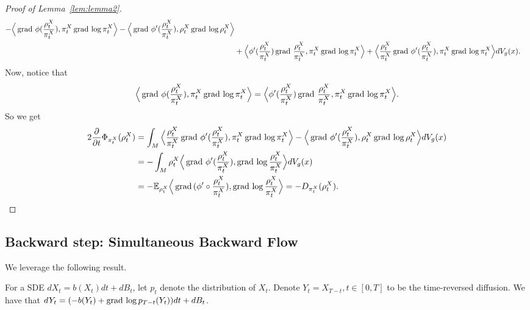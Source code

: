 \begin{proof}[Proof of Lemma~\ref{lem:lemma2}]
\begin{align*}
            - \Big\langle \operatorname{grad\,} \phi(\frac{\rho_{t}^{X}}{\pi_{t}^{X}}), \pi_{t}^{X} \operatorname{grad\,} \log \pi_{t}^{X} \Big\rangle
            - \Big\langle \operatorname{grad\,} \phi'(\frac{\rho_{t}^{X}}{\pi_{t}^{X}}) , \rho_{t}^{X} \operatorname{grad\,} \log \rho_{t}^{X} \Big\rangle \\ & 
            + \Big\langle  \phi'(\frac{\rho_{t}^{X}}{\pi_{t}^{X}}) \operatorname{grad\,} \frac{\rho_{t}^{X}}{\pi_{t}^{X}}, \pi_{t}^{X} \operatorname{grad\,} \log \pi_{t}^{X} \Big\rangle 
            + \Big\langle \frac{\rho_{t}^{X}}{\pi_{t}^{X}}\operatorname{grad\,} \phi'(\frac{\rho_{t}^{X}}{\pi_{t}^{X}}) , \pi_{t}^{X} \operatorname{grad\,} \log \pi_{t}^{X} \Big\rangle dV_{g}(x).
    \end{align*}
  Now, notice that 
    \begin{align*}
        \Big\langle \operatorname{grad\,} \phi(\frac{\rho_{t}^{X}}{\pi_{t}^{X}}), \pi_{t}^{X} \operatorname{grad\,} \log \pi_{t}^{X} \Big\rangle
        = \Big\langle \phi'(\frac{\rho_{t}^{X}}{\pi_{t}^{X}}) \operatorname{grad\,} \frac{\rho_{t}^{X}}{\pi_{t}^{X}}, \pi_{t}^{X} \operatorname{grad\,} \log \pi_{t}^{X} \Big\rangle.
    \end{align*}
    So we get 
    \begin{align*}
            2 \frac{\partial }{\partial t} \Phi_{\pi_{t}^{X}} (\rho_{t}^{X})
            &= \int_{M} \Big\langle \frac{\rho_{t}^{X}}{\pi_{t}^{X}}\operatorname{grad\,} \phi'(\frac{\rho_{t}^{X}}{\pi_{t}^{X}}) , \pi_{t}^{X} \operatorname{grad\,} \log \pi_{t}^{X} \Big\rangle 
            - \Big\langle \operatorname{grad\,} \phi'(\frac{\rho_{t}^{X}}{\pi_{t}^{X}}) , \rho_{t}^{X} \operatorname{grad\,} \log \rho_{t}^{X} \Big\rangle dV_{g}(x)\\
            &= - \int_{M} \rho_{t}^{X} \Big\langle \operatorname{grad\,} \phi'(\frac{\rho_{t}^{X}}{\pi_{t}^{X}}) , \operatorname{grad\,} \log \frac{\rho_{t}^{X}}{\pi_{t}^{X}} \Big\rangle dV_{g}(x) \\
            &= - \mathbb{E}_{\rho_{t}^{X}} \Big\langle \operatorname{grad\,} (\phi' \circ \frac{\rho_{t}^{X}}{\pi_{t}^{X}}) , \operatorname{grad\,} \log \frac{\rho_{t}^{X}}{\pi_{t}^{X}} \Big\rangle 
            = - D_{\pi_{t}^{X}} (\rho_{t}^{X}).
    \end{align*}
\end{proof}

\subsection{Backward step: Simultaneous Backward Flow}\label{Section_Backward}
We leverage the following result.
\begin{theorem}
For a SDE $dX_{t} = b(X_{t}) dt + dB_{t}$, let $p_{t}$ denote the distribution of $X_{t}$. Denote $Y_{t} = X_{T - t}, t \in [0, T]$ to be the time-reversed diffusion. We have that $dY_{t} = (-b(Y_{t}) + \operatorname{grad\,} \log p_{T - t} (Y_{t}) ) dt + dB_{t}$.
\end{theorem}

